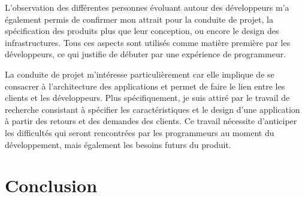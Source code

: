 \documentclass[11pt, oneside, titlepage, a4paper]{article}
\begin{document}
L'observation des différentes personnes évoluant autour des développeurs m'a également permis de confirmer mon attrait pour la conduite de projet, la spécification des produits plus que leur conception, ou encore le design des infrastructures. Tous ces aspects sont utilisés comme \og matière première\fg{} par les développeurs, ce qui justifie de débuter par une expérience de programmeur.

La conduite de projet m'intéresse particulièrement car elle implique de se consacrer à l'architecture des applications et permet de faire le lien entre les clients et les développeurs. Plus spécifiquement, je suis attiré par le travail de recherche consistant à spécifier les caractéristiques et le design d'une application à partir des retours et des demandes des clients. Ce travail nécessite d'anticiper les difficultés qui seront rencontrées par les programmeurs au moment du développement, mais également les besoins futurs du produit. 
\newpage
\section{Conclusion}
\end{document}

